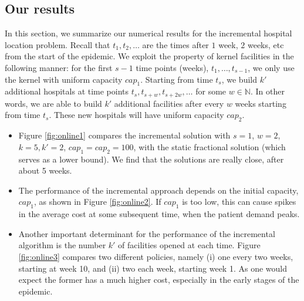 


\newpage
\subsection{Our results}
In this section, we summarize our numerical results for the incremental hospital location problem. Recall that $t_1, t_2, \ldots$ are the times after $1$ week, $2$ weeks, etc from the start of the epidemic. We exploit the property of kernel facilities in the following manner: for the first $s-1$ time points (weeks), $t_1, \ldots, t_{s-1}$, we only use the kernel with uniform capacity $cap_1$. Starting from time $t_{s}$, we build $k'$ additional hospitals at time points  $t_s, t_{s+w}, t_{s+2w}, \ldots$ for some $w \in \mathbb{N}$. In other words, we are able to build $k'$ additional facilities after every $w$ weeks starting from time $t_s$. These new hospitals will have uniform capacity $cap_2$.


\begin{itemize}
\item
Figure \ref{fig:online1} compares the incremental solution with 
$s=1$, $w=2$, $k=5, k' = 2$, $cap_1 = cap_2 = 100$, with the static fractional solution
(which serves as a lower bound). We find that the solutions are really close, after about 5 weeks.
\item
The performance of the incremental approach depends on the initial capacity, $cap_1$, as shown
in Figure \ref{fig:online2}. If $cap_1$ is too low, this can cause spikes in the average cost
at some subsequent time, when the patient demand peaks.
\item
Another important determinant for the performance of the incremental algorithm is the
number $k'$ of facilities opened at each time. Figure \ref{fig:online3} compares two different
policies, namely (i) one every two weeks, starting at week 10, and
(ii) two each week, starting week 1. As one would expect the former has a much
higher cost, especially in the early stages of the epidemic.
\end{itemize}


